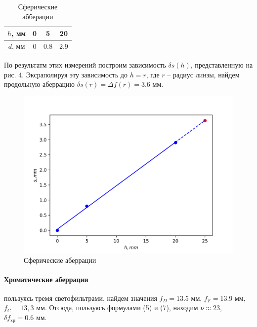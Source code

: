 \documentclass[a4paper,12pt]{article}
\theoremstyle{definition}
\begin{document}
\begin{table}[H]
    \centering
    \caption{Сферические абберации}
    \begin{tabular}{|c|c|c|c|} \hline
        $h$, мм & 0 & 5 & 20 \\ \hline
        $d$, мм & 0 & 0.8 & 2.9 \\ \hline
    \end{tabular}
\end{table}

\noindent
По результатм этих измерений построим зависимость $\delta s(h)$, представленную на рис. 4. Эксраполируя эту зависимость до $h = r$, где $r$ -- радиус линзы, найдем продольную аберрацию $\delta s(r) = \Delta f(r) = 3.6$ мм.

\begin{figure}[H]
    \centering
    \includegraphics[scale=0.9]{1.png}
    \caption{Сферические аберрации}
\end{figure}

\newpage
\paragraph{Хроматические аберрации} пользуясь тремя светофильтрами, найдем значения $f_D = 13.5$ мм, $f_F = 13.9$ мм, $f_C = 13,3$ мм. Отсюда, пользуясь формулами (5) и (7), находим $\nu \approx 23$, $\delta f_\text{хр} = 0.6$ мм.
\end{document}
